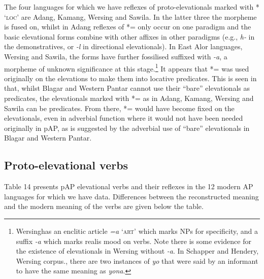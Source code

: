 The four languages for which we have reflexes of proto-elevationals marked with *{\ng} `\textsc{loc}' are Adang, Kamang, Wersing and Sawila. In the latter three the morpheme is fused on, whilst in Adang reflexes of *={\ng} only occur on one paradigm and the basic elevational forms combine with other affixes in other paradigms (e.g., \textit{h}\textit{{\textepsilon}}\textit{{}-} in the demonstratives, or \textit{{}-l}\textit{{\textepsilon}} in directional elevationals). In East Alor languages, Wersing and Sawila, the forms have further fossilised suffixed with \textit{{}-a}, a morpheme of unknown significance at this stage.\footnote{{}  Wersinghas an enclitic article \textit{=a} `\textsc{art}' which marks NPs for specificity, and a suffix \textit{{}-a} which marks realis mood on verbs. Note there is some evidence for the existence of elevationals in Wersing without \textit{{}-a}. In Schapper and Hendery, Wersing corpus., there are two instances of \textit{yo{\ng}} that were said by an informant to have the same meaning as \textit{yona}.} It appears that *={\ng} was used originally on the elevations to make them into locative predicates. This is seen in that, whilst Blagar and Western Pantar cannot use their ``bare'' elevationals as predicates, the elevationals marked with *={\ng} as in Adang, Kamang, Wersing and Sawila can be predicates. From there, *={\ng} would have become fixed on the elevationals, even in adverbial function where it would not have been needed originally in pAP, as is suggested by the adverbial use of ``bare'' elevationals in Blagar and Western Pantar.

\subsection{Proto-elevational verbs}\label{sec:7:4.2}
Table 14 presents pAP elevational verbs and their reflexes in the 12 modern AP languages for which we have data. Differences between the reconstructed meaning and the modern meaning of the verbs are given below the table. 

